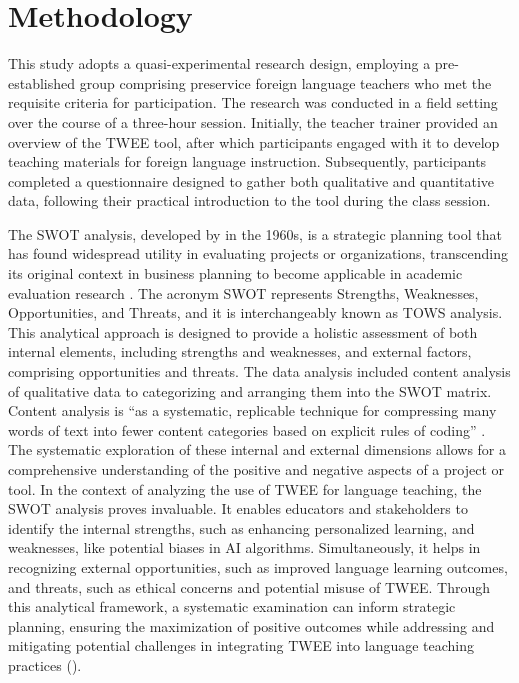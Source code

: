 \section{Methodology}\label{sec-methodology}

This study adopts a quasi-experimental research design, employing a
pre-established group comprising preservice foreign language teachers
who met the requisite criteria for participation. The research was
conducted in a field setting over the course of a three-hour session.
Initially, the teacher trainer provided an overview of the TWEE tool,
after which participants engaged with it to develop teaching materials
for foreign language instruction. Subsequently, participants completed a
questionnaire designed to gather both qualitative and quantitative data,
following their practical introduction to the tool during the class
session.

The SWOT analysis, developed by \textcite{learned1965} in the 1960s, is a
strategic planning tool that has found widespread utility in evaluating
projects or organizations, transcending its original context in business
planning \cite{chermack2007} to become applicable in academic
evaluation research \cite{romerogutierrez2015}. The acronym SWOT
represents Strengths, Weaknesses, Opportunities, and Threats, and it is
interchangeably known as TOWS analysis. This analytical approach is
designed to provide a holistic assessment of both internal elements,
including strengths and weaknesses, and external factors, comprising
opportunities and threats. The data analysis included content analysis
of qualitative data to categorizing and arranging them into the SWOT
matrix. Content analysis is ``as a systematic, replicable technique for
compressing many words of text into fewer content categories based on
explicit rules of coding'' \cite{stemler2000}. The systematic exploration
of these internal and external dimensions allows for a comprehensive
understanding of the positive and negative aspects of a project or tool.
In the context of analyzing the use of TWEE for language teaching, the
SWOT analysis proves invaluable. It enables educators and stakeholders
to identify the internal strengths, such as enhancing personalized
learning, and weaknesses, like potential biases in AI algorithms.
Simultaneously, it helps in recognizing external opportunities, such as
improved language learning outcomes, and threats, such as ethical
concerns and potential misuse of TWEE. Through this analytical
framework, a systematic examination can inform strategic planning,
ensuring the maximization of positive outcomes while addressing and
mitigating potential challenges in integrating TWEE into language
teaching practices ().

